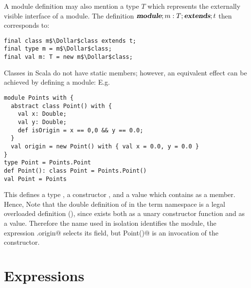 \documentclass[11pt]{report}
\begin{document}
\begin{itemize}
A module definition may also mention a type $T$ which represents the
externally visible interface of a module. The definition $\mbox{\sl\bfseries module};m:
T;\mbox{\sl\bfseries extends};t$ then corresponds to:
\begin{verbatim}
final class m$\Dollar$class extends t;
final type m = m$\Dollar$class;
final val m: T = new m$\Dollar$class;
\end{verbatim}

\example
Classes in Scala do not have static members; however, an equivalent
effect can be achieved by defining a module:
E.g.
\begin{verbatim}
module Points with {
  abstract class Point() with {
    val x: Double;
    val y: Double;
    def isOrigin = x == 0,0 && y == 0.0;
  }
  val origin = new Point() with { val x = 0.0, y = 0.0 }
}
type Point = Points.Point
def Point(): class Point = Points.Point()
val Point = Points
\end{verbatim}
This defines a type \verb@Point@, a constructor \verb@Point@, and a
value \verb@Point@ which contains \verb@origin@ as a member.  Hence,
Note that the double definition of \verb@Point@ in the term namespace
is a legal overloaded definition (), since
\verb@Point@ exists both as a unary constructor function and as a
value. Therefore the name \verb@Point@ used in isolation identifies
the \verb@Point@ module, the expression \verb@Point.origin@ selects
its \verb@origin@ field, but \verb@new Point()@ is an invocation of
the \verb@Point@ constructor.


\chapter{Expressions}
\label{sec:exprs}


\end{itemize}
\end{document}
